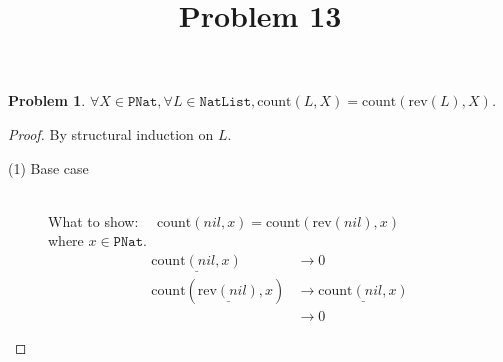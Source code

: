 \documentclass[12pt, a4paper]{article}
\title{Problem 13}
\date{\vspace{-5ex}}
\newtheorem{problem}{Problem}
\newcommand{\rmx}[1]{\mathrm{#1}}
\newcommand{\larrow}{\longrightarrow}
\newcommand{\under}{\underline}
\begin{document}
\maketitle


\begin{problem}
$\forall X \in \mathtt{PNat}, \forall L \in \mathtt{NatList}, \rmx{count}(L, X) = \rmx{count}(\rmx{rev}(L), X)$.
\end{problem}
\begin{proof}
By structural induction on $L$.
\begin{description}
\item[(1) Base case]~\\
\noindent
What to show: $\quad \rmx{count}(nil, x) = \rmx{count}(\rmx{rev}(nil), x)$\\
where $x \in \mathtt{PNat}$.
\begin{align*}
\under{\rmx{count}(nil, x)} 
	&\larrow 0 \tag{by cnt1} \\
\rmx{count}(\under{\rmx{rev}(nil)}, x)
	&\larrow \under{\rmx{count}(nil, x)} \tag{by rev1} \\
	&\larrow 0 \tag{by cnt1}
\end{align*}


\end{description}
\end{proof}
\end{document}
